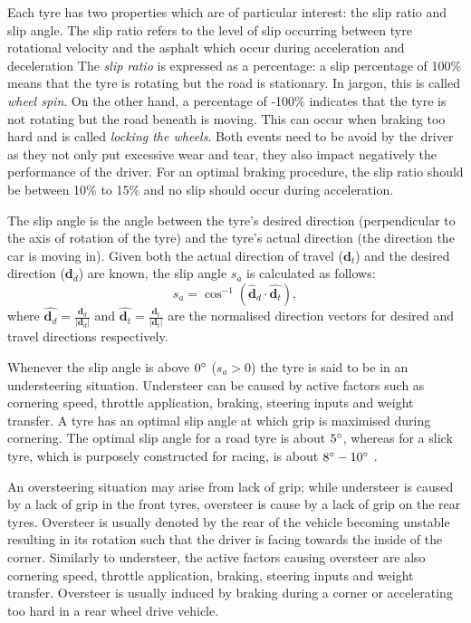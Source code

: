 \documentclass{sig-alternate}
\begin{document}
{Each tyre has two properties which are of particular interest: the slip ratio and slip angle. The slip ratio refers to the level of slip occurring between tyre rotational velocity and the asphalt which occur during acceleration and deceleration The \emph{slip ratio} is expressed as a percentage: a slip percentage of 100\% means that the tyre is rotating but the road is stationary. In jargon, this is called \emph{wheel spin}. On the other hand, a percentage of -100\% indicates that the tyre is not rotating but the road beneath is moving. This can occur when braking too hard and is called \emph{locking the wheels}. Both events need to be avoid by the driver as they not only put excessive wear and tear, they also impact negatively the performance of the driver. For an optimal braking procedure, the slip ratio should be between 10\% to 15\% \cite{GoingFaster} and no slip should occur during acceleration.

The slip angle is the angle between the tyre's desired direction (perpendicular to the axis of rotation of the tyre) and the tyre's actual direction (the direction the car is moving in). Given both the actual direction of travel ($\mathbf{d}_t$) and the desired direction ($\mathbf{d}_d$) are known, the slip angle $s_a$ is calculated as follows:
\begin{equation}
s_a = \cos^{-1}(\hat{\mathbf{d}}_d \cdot \hat{\mathbf{d}_t}),
\end{equation}
\noindent where $\hat{\mathbf{d}_d} = \frac{\mathbf{d}_d}{|\mathbf{d}_d|}$ and $\hat{\mathbf{d}_t} = \frac{\mathbf{d}_t}{|\mathbf{d}_t|}$ are the normalised direction vectors for desired and travel directions respectively.

Whenever the slip angle is above $0\degree$ ($s_a > 0$) the tyre is said to be in an understeering situation. Understeer can be caused by active factors such as cornering speed, throttle application, braking, steering inputs and weight transfer. A tyre has an optimal slip angle at which grip is maximised during cornering. The optimal slip angle for a road tyre is about $5\degree$, whereas for a slick tyre, which is purposely constructed for racing, is about $8\degree-10\degree$ \cite{beckman1991physics}.

An oversteering situation may arise from lack of grip; while understeer is caused by a lack of grip in the front tyres, oversteer is cause by a lack of grip on the rear tyres. Oversteer is usually denoted by the rear of the vehicle becoming unstable resulting in its rotation such that the driver is facing towards the inside of the corner. Similarly to understeer, the active factors causing oversteer are also cornering speed, throttle application, braking, steering inputs and weight transfer. Oversteer is usually induced by braking during a corner or accelerating too hard in a rear wheel drive vehicle.

}
\end{document}
